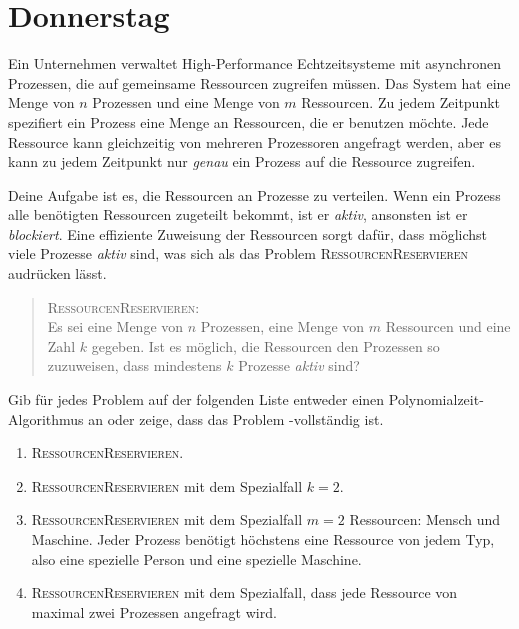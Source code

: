 \documentclass{uebung_cs}
\begin{document}
\section*{Donnerstag}

\begin{aufgabe}[Ressourcenmanagement]
	Ein Unternehmen verwaltet High-Performance Echtzeitsysteme mit asynchronen Prozessen, die auf gemeinsame Ressourcen zugreifen müssen. Das System hat eine Menge von $n$ Prozessen und eine Menge von $m$ Ressourcen. 
	Zu jedem Zeitpunkt spezifiert ein Prozess eine Menge an Ressourcen, die er benutzen möchte. Jede Ressource kann gleichzeitig von mehreren Prozessoren angefragt werden, aber es kann zu jedem Zeitpunkt nur \emph{genau} ein Prozess auf die Ressource zugreifen. 
	
	Deine Aufgabe ist es, die Ressourcen an Prozesse zu verteilen. Wenn ein Prozess alle benötigten Ressourcen zugeteilt bekommt, ist er \textit{aktiv}, ansonsten ist er \textit{blockiert}. Eine effiziente Zuweisung der Ressourcen sorgt dafür, dass möglichst viele Prozesse \textit{aktiv} sind, was sich als das Problem \textsc{RessourcenReservieren} audrücken lässt.
	 \begin{quote}
	 \textsc{RessourcenReservieren}:\\
	 Es sei eine Menge von $n$ Prozessen, eine Menge von $m$ Ressourcen und eine Zahl $k$ gegeben. Ist es möglich, die Ressourcen den Prozessen so zuzuweisen, dass mindestens $k$ Prozesse \textit{aktiv} sind?
	 \end{quote}
	 
	Gib für jedes Problem auf der folgenden Liste entweder einen Polynomialzeit-Algorithmus an oder zeige, dass das Problem \NP-vollständig ist.
	 \begin{enumerate}
	 	\item \textsc{RessourcenReservieren}.
	 	\item \textsc{RessourcenReservieren} mit dem Spezialfall $k=2$.
	 	\item \textsc{RessourcenReservieren} mit dem Spezialfall $m=2$ Ressourcen: Mensch und Maschine. Jeder Prozess benötigt höchstens eine Ressource von jedem Typ, also eine spezielle Person und eine spezielle Maschine.
	 	\item \textsc{RessourcenReservieren} mit dem Spezialfall, dass jede Ressource von maximal zwei Prozessen angefragt wird.	 	
	 \end{enumerate}
\end{aufgabe}
\end{document}
